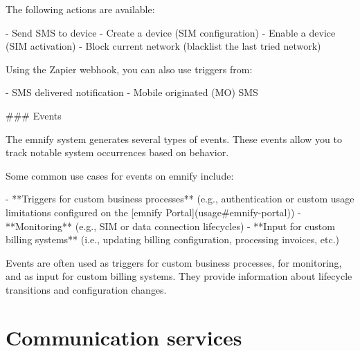 \documentclass[11pt, oneside]{article}   	%
\newcommand{\addspace}{\vspace{2mm}}
\begin{document}
\addspace
\begin{markdown}

The following actions are available:

\end{markdown}
\addspace
\begin{markdown}
- Send SMS to device
- Create a device (SIM configuration)
- Enable a device (SIM activation)
- Block current network (blacklist the last tried network)
\end{markdown}
\addspace
\begin{markdown}

Using the Zapier webhook, you can also use triggers from:

\end{markdown}
\addspace
\begin{markdown}
- SMS delivered notification
- Mobile originated (MO) SMS
\end{markdown}
\addspace
\begin{markdown}

### Events

The emnify system generates several types of events.
These events allow you to track notable system occurrences based on behavior.

Some common use cases for events on emnify include:

\end{markdown}
\addspace
\begin{markdown}
- **Triggers for custom business processes** (e.g., authentication or custom usage limitations configured on the [emnify Portal](usage#emnify-portal))
- **Monitoring** (e.g., SIM or data connection lifecycles)
- **Input for custom billing systems** (i.e., updating billing configuration, processing invoices, etc.)
\end{markdown}
\addspace
\begin{markdown}

Events are often used as triggers for custom business processes, for monitoring, and as input for custom billing systems.
They provide information about lifecycle transitions and configuration changes.

\end{markdown}
\pagebreak[4]
\section{Communication services}
\end{document}
